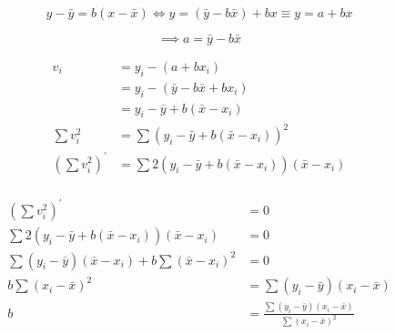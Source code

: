 \documentclass[a4paper]{article}
\begin{document}
\[y-\bar y=b(x-\bar x)\iff y=(\bar y-b\bar x)+bx\equiv y=a+bx\]

\[\implies a=\bar y-b\bar x\]

\[\begin{aligned}
	v_i&=y_i-(a+bx_i)\\
	&=y_i-(\bar y-b\bar x+bx_i)\\
	&=y_i-\bar y+b(\bar x-x_i)\\
	\sum v_i^2&=\sum(y_i-\bar y+b(\bar x-x_i))^2\\
	\left(\sum v_i^2\right)^\prime&=\sum2(y_i-\bar y+b(\bar x-x_i))(\bar x-x_i)\\
\end{aligned}\]

\[\begin{aligned}
	\left(\sum v_i^2\right)^\prime&=0\\
	\sum2(y_i-\bar y+b(\bar x-x_i))(\bar x-x_i)&=0\\
	\sum(y_i-\bar y)(\bar x-x_i)+b\sum (\bar x-x_i)^2&=0\\
	b\sum (x_i-\bar x)^2&=\sum(y_i-\bar y)(x_i-\bar x)\\
	b&=\boxed{\frac{\sum(y_i-\bar y)(x_i-\bar x)}{\sum (x_i-\bar x)^2}}\\
\end{aligned}\]
\end{document}
